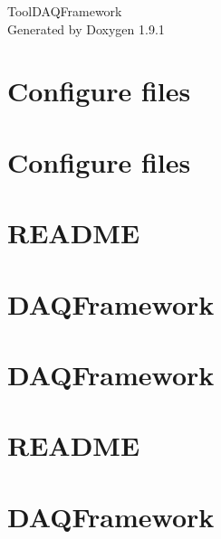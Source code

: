 \let\mypdfximage\pdfximage\def\pdfximage{\immediate\mypdfximage}\documentclass[twoside]{book}
\newcommand{\+}{\discretionary{\mbox{\scriptsize$\hookleftarrow$}}{}{}}
\newcommand{\clearemptydoublepage}{%
  \newpage{\pagestyle{empty}\cleardoublepage}%
}
\begin{document}
\raggedbottom

\hypersetup{pageanchor=false,
             bookmarksnumbered=true,
             pdfencoding=unicode
            }
\begin{titlepage}
\vspace*{7cm}
\begin{center}%
{\Large Tool\+DAQFramework }\\
\vspace*{1cm}
{\large Generated by Doxygen 1.9.1}\\
\end{center}
\end{titlepage}
\clearemptydoublepage
{}
\tableofcontents
\clearemptydoublepage
{}
\hypersetup{pageanchor=true}

\chapter{Configure files}
\label{md_configfiles_README}

\chapter{Configure files}
\label{md_configfiles_template_README}

\chapter{README}
\label{md_DataModel_README}

\chapter{DAQFramework}
\label{md_include_README}

\chapter{DAQFramework}
\label{md_lib_README}

\chapter{README}
\label{md_README}

\chapter{DAQFramework}
\label{md_src_Store_README}

\end{document}
